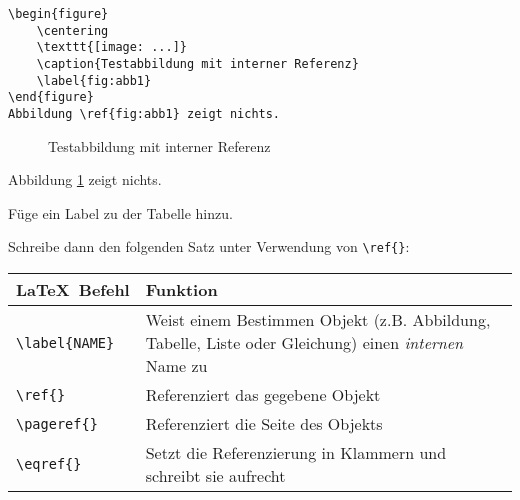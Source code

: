\begin{frame}[fragile]
	\Code
	\begin{lstlisting}
\begin{figure}
	\centering
	\texttt{[image: ...]}
	\caption{Testabbildung mit interner Referenz}
	\label{fig:abb1}
\end{figure}	
Abbildung \ref{fig:abb1} zeigt nichts.		
	\end{lstlisting}

	\Ausgabe
	\begin{outputbox}
		\vspace{1cm}
		\begin{figure}
			\centering
			\caption{Testabbildung mit interner Referenz}
			\label{fig:abb1}
		\end{figure}
		\vspace{-1cm}
		Abbildung \ref{fig:abb1} zeigt nichts.	
	\end{outputbox}
\end{frame}
\begin{frame}[fragile]
	\begin{Aufgabe}
		Füge ein Label zu der Tabelle  hinzu.
		
		Schreibe dann den folgenden Satz unter Verwendung von \lstinline[basicstyle=\normalfont\ttfamily\normalsize]|\ref{}|:
		
		\textrm{}
	\end{Aufgabe}

	\btVFill\Befehle
	\begin{center}
		\begin{tabular}{lp{6cm}}
			\toprule
			\LaTeX\ Befehl					&	Funktion					\\ \midrule
			\lstinline|\label{NAME}|		&	Weist einem Bestimmen Objekt (z.B. Abbildung, Tabelle, Liste oder Gleichung) einen \emph{internen} Name zu		\\
			\lstinline|\ref{}|				&	Referenziert das gegebene Objekt								\\
			\lstinline|\pageref{}|			&	Referenziert die Seite des Objekts								\\
			\lstinline|\eqref{}|			&	Setzt die Referenzierung in Klammern und schreibt sie aufrecht	\\
			\bottomrule
		\end{tabular}
	\end{center}
	\vspace{0.1cm}
\end{frame}
